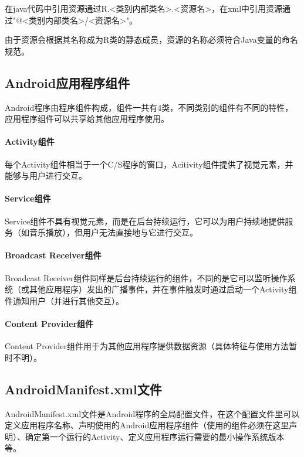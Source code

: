 \documentclass[UTF8]{ctexart}
\begin{document}
	在java代码中引用资源通过R.<类别内部类名>.<资源名>，在xml中引用资源通过"@<类别内部类名>/<资源名>"。

    由于资源会根据其名称成为R类的静态成员，资源的名称必须符合Java变量的命名规范。
	\subsection{Android应用程序组件} Android程序由程序组件构成，组件一共有4类，不同类别的组件有不同的特性，应用程序组件可以共享给其他应用程序使用。
		\paragraph{Activity组件} 每个Activity组件相当于一个C/S程序的窗口，Acitivity组件提供了视觉元素，并能够与用户进行交互。
		\paragraph{Service组件} Service组件不具有视觉元素，而是在后台持续运行，它可以为用户持续地提供服务（如音乐播放），但用户无法直接地与它进行交互。
		\paragraph{Broadcast Receiver组件} Broadcast Receiver组件同样是后台持续运行的组件，不同的是它可以监听操作系统（或其他应用程序）发出的广播事件，并在事件触发时通过启动一个Activity组件通知用户（并进行其他交互）。
		\paragraph{Content Provider组件} Content Provider组件用于为其他应用程序提供数据资源（具体特征与使用方法暂时不明）。
	\subsection{AndroidManifest.xml文件} AndroidManifest.xml文件是Android程序的全局配置文件，在这个配置文件里可以定义应用程序名称、声明使用的Android应用程序组件（使用的组件必须在这里声明）、确定第一个运行的Activity、定义应用程序运行需要的最小操作系统版本等。
\end{document}
